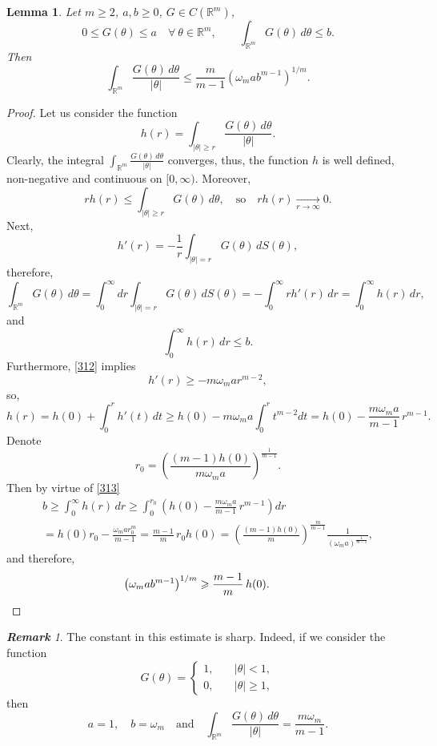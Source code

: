 \documentclass[a4paper,12pt]{article}
\numberwithin{equation}{section}
\def \te{\theta}
\def \oo{\omega}
\def \R{\mathbb{R}}
\newcommand{\<}{\langle}
\renewcommand{\>}{\rangle}
\theoremstyle{plain}
\newtheorem{lemma}[theorem]{\bf Lemma}
\theoremstyle{definition}
\theoremstyle{remark}
\newtheorem{rem}[theorem]{\bf Remark}
\renewcommand{\le}{\leqslant}
\renewcommand{\ge}{\geqslant}
\begin{document}
\begin{lemma}
\label{l312}
Let $m \ge 2$, $a,b \ge 0$, $G \in C(\R^m)$,
$$
0 \le G(\te) \le a \quad \forall \ \te \in \R^m, 
\qquad \int_{\R^m} G(\te) \, d\te \le b.
$$
Then
$$
\int_{\R^m} \frac{G(\te)\, d\te}{|\te|} \le 
\frac{m}{m-1} \left(\oo_m a b^{m-1}\right)^{1/m}.
$$
\end{lemma}

\begin{proof}
Let us consider the function
$$
h(r) = \int_{|\te| \ge r} \frac{G(\te)\, d\te}{|\te|}.
$$
Clearly, the integral $\int_{\R^m} \frac{G(\te)\, d\te}{|\te|}$ converges,
thus, the function $h$ is well defined, non-negative and continuous on $[0,\infty)$.
Moreover,
$$
r h(r) \le \int_{|\te| \ge r} G(\te)\, d\te, \quad \text{so} \quad
r h(r) \mathop{\longrightarrow}\limits_{r \to \infty} 0.
$$
Next,
\begin{equation}
\label{312}
h'(r) = - \frac1r \int_{|\te|=r} G(\te) \, dS(\te),
\end{equation}
therefore,
$$
\int_{\R^m} G(\te) \, d\te = \int_0^\infty dr \int_{|\te|=r} G(\te) \, dS(\te)
= - \int_0^\infty r h'(r)\, dr = \int_0^\infty h(r) \, dr,
$$
and
\begin{equation}
\label{313}
\int_0^\infty h(r) \, dr \le b.
\end{equation}
Furthermore, \eqref{312} implies
$$
h'(r) \ge - m \oo_m a r^{m-2},
$$
so,
$$
h(r) = h(0) + \int_0^r h'(t)\,dt
\ge h(0) - m \oo_m a \int_0^r t^{m-2} dt 
= h(0) - \frac{m \oo_m a}{m-1} \, r^{m-1}.
$$
Denote
$$
r_0 = \left(\frac{(m-1) h(0)}{m \oo_m a}\right)^{\frac1{m-1}}.
$$
Then by virtue of \eqref{313}
\begin{eqnarray*}
b \ge \int_0^\infty h(r)\, dr 
\ge \int_0^{r_0} \left(h(0) - \frac{m \oo_m a}{m-1} \, r^{m-1}\right) dr \\
= h(0) r_0 - \frac{\oo_m a r_0^m}{m-1}
= \frac{m-1}m \, r_0 h(0)
= \left(\frac{(m-1) h(0)}m\right)^{\frac{m}{m-1}} \frac1{(\oo_m a)^{\frac1{m-1}}},
\end{eqnarray*}
and therefore,
$$
\left(\oo_m a b^{m-1}\right)^{1/m} \ge \frac{m-1}m \, h(0).
\qquad \qedhere
$$
\end{proof}

\begin{rem}
The constant in this estimate is sharp.
Indeed, if we consider the function
$$
G(\te) = \begin{cases}
1, \quad &|\te| < 1, \\
0, \quad &|\te| \ge 1,
\end{cases}
$$
then
$$
a = 1, \quad b = \oo_m \quad \text{and} \quad
\int_{\R^m} \frac{G(\te)\, d\te}{|\te|} = \frac{m \oo_m}{m-1}.
$$
\end{rem}
\end{document}
